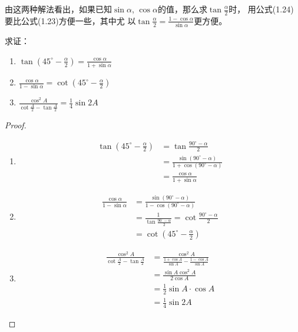 由这两种解法看出，如果已知$\sin\alpha$, $\cos\alpha$的值，那么求$\tan\frac{\alpha}{2}$时，
用公式(1.24)要比公式(1.23)方便一些，其中尤
以$\tan\frac{\alpha}{2}=\frac{1-\cos\alpha}{\sin\alpha}$更方便。

\begin{example}
    求证：
\begin{multicols}{2}
    \begin{enumerate}
    \item $\tan\left(45^{\circ}-\frac{\alpha}{2}\right)=\frac{\cos\alpha}{1+\sin\alpha}$
    \item $\frac{\cos\alpha}{1-\sin\alpha}=\cot \left(45^{\circ}-\frac{\alpha}{2}\right)$
    \item $\frac{\cos^2 A}{\cot\frac{A}{2}-\tan\frac{A}{2}}=\frac{1}{4}\sin 2A$
\end{enumerate}
\end{multicols}
\end{example}

\begin{proof}
\begin{enumerate}
    \item \[\begin{split}
\tan\left(45^{\circ}-\frac{\alpha}{2}\right) &=\tan\frac{90^{\circ}-\alpha}{2}\\ 
&=\frac{\sin(90^{\circ}-\alpha)}{1+\cos(90^{\circ}-\alpha)}\\
&=\frac{\cos\alpha}{1+\sin\alpha}
    \end{split}\]

    \item \[\begin{split}
        \frac{\cos\alpha}{1-\sin\alpha}&= \frac{\sin(90^{\circ}-\alpha)}{1-\cos(90^{\circ}-\alpha)}\\
        &=\frac{1}{\tan\frac{90^{\circ}-\alpha}{2}}=\cot\frac{90^{\circ}-\alpha}{2}\\
&=\cot\left(45^{\circ}-\frac{\alpha}{2}\right)
    \end{split}\]

    \item \[\begin{split}
\frac{\cos^2 A}{\cot\frac{A}{2}-\tan\frac{A}{2}}&=\frac{\cos^2 A}{\frac{1+\cos A}{\sin A}-\frac{1-\cos A}{\sin A}}\\        
&=\frac{\sin A\cos^2 A}{2\cos A}\\
&=\frac{1}{2}\sin A\cdot \cos A\\
&=\frac{1}{4}\sin 2A
    \end{split}\]
\end{enumerate}    
\end{proof}

